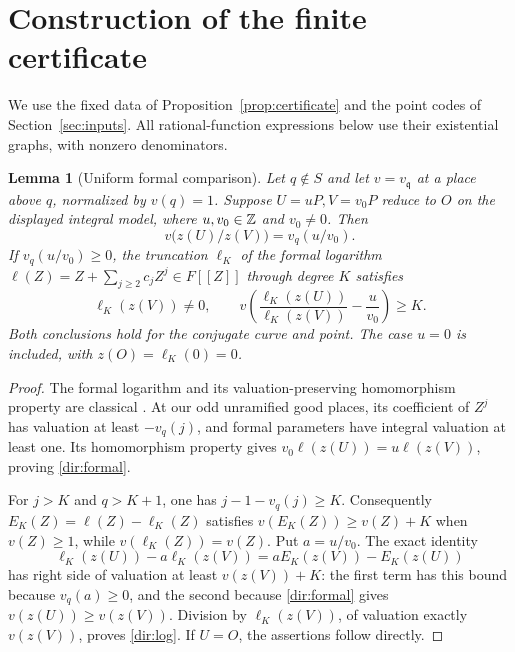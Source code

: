 \documentclass[11pt]{article}
\newtheorem{lemma}[theorem]{Lemma}
\theoremstyle{definition}\newtheorem{inputthm}[theorem]{Hypothesis}
\theoremstyle{remark}\newtheorem{remark}[theorem]{Remark}
\begin{document}
\section{Construction of the finite certificate}\label{app:certificate}

We use the fixed data of Proposition~\ref{prop:certificate} and the
point codes of Section~\ref{sec:inputs}. All rational-function expressions
below use their existential graphs, with nonzero denominators.

\begin{lemma}[Uniform formal comparison]\label{dir:formal-lemma}
Let $q\notin S$ and let $v=v_{\mathfrak q}$ at a place above
$q$, normalized by $v(q)=1$. Suppose $U=uP,V=v_0P$ reduce to $O$
on the displayed integral model, where $u,v_0\in\mathbb Z$ and $v_0\ne0$.
Then
\begin{equation}\label{dir:formal}
 v\bigl(z(U)/z(V)\bigr)=v_q(u/v_0).
\end{equation}
If $v_q(u/v_0)\ge0$, the truncation $\ell_K$ of the formal
logarithm $\ell(Z)=Z+\sum_{j\ge2}c_jZ^j\in F[[Z]]$ through
degree $K$ satisfies
\begin{equation}\label{dir:log}
 \ell_K(z(V))\ne0,\qquad
 v\left(\frac{\ell_K(z(U))}{\ell_K(z(V))}-\frac{u}{v_0}\right)\ge K.
\end{equation}
Both conclusions hold for the conjugate curve and point. The case
$u=0$ is included, with $z(O)=\ell_K(0)=0$.
\end{lemma}
\begin{proof}
The formal logarithm and its valuation-preserving homomorphism property
are classical \cite[Proposition~IV.5.5, Lemma~IV.6.3, and
Theorem~IV.6.4]{Silverman}. At our odd unramified good places, its
coefficient of $Z^j$ has valuation at least $-v_q(j)$, and formal
parameters have integral valuation at least one. Its homomorphism property
gives $v_0\ell(z(U))=u\ell(z(V))$, proving \eqref{dir:formal}.

For $j>K$ and $q>K+1$, one has $j-1-v_q(j)\ge K$.
Consequently $E_K(Z)=\ell(Z)-\ell_K(Z)$ satisfies
$v(E_K(Z))\ge v(Z)+K$ when $v(Z)\ge1$, while
$v(\ell_K(Z))=v(Z)$. Put $a=u/v_0$. The exact identity
\[
 \ell_K(z(U))-a\ell_K(z(V))
       =aE_K(z(V))-E_K(z(U))
\]
has right side of valuation at least $v(z(V))+K$: the first
term has this bound because $v_q(a)\ge0$, and the second because
\eqref{dir:formal} gives $v(z(U))\ge v(z(V))$.
Division by $\ell_K(z(V))$, of valuation exactly $v(z(V))$,
proves \eqref{dir:log}. If $U=O$, the assertions follow directly.
\end{proof}
\end{document}
